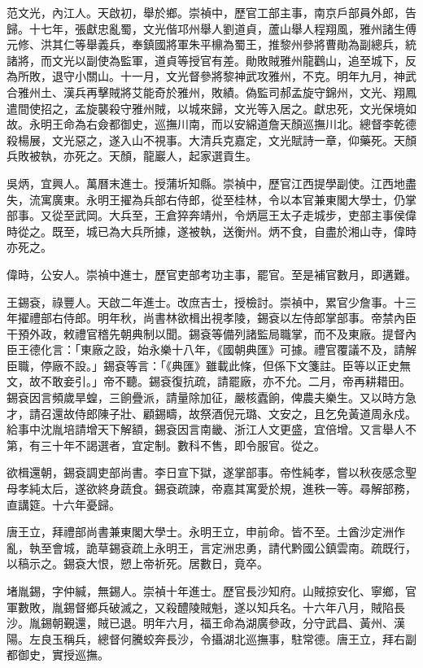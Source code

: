 \begin{pinyinscope}
范文光，內江人。天啟初，舉於鄉。崇禎中，歷官工部主事，南京戶部員外郎，告歸。十七年，張獻忠亂蜀，文光偕邛州舉人劉道貞，蘆山舉人程翔風，雅州諸生傅元修、洪其仁等舉義兵，奉鎮國將軍朱平檙為蜀王，推黎州參將曹勛為副總兵，統諸將，而文光以副使為監軍，道貞等授官有差。勛敗賊雅州龍鸛山，追至城下，反為所敗，退守小關山。十一月，文光督參將黎神武攻雅州，不克。明年九月，神武合雅州土、漢兵再擊賊將艾能奇於雅州，敗績。偽監司郝孟旋守錦州，文光、翔鳳遣間使招之，孟旋襲殺守雅州賊，以城來歸，文光等入居之。獻忠死，文光保境如故。永明王命為右僉都御史，巡撫川南，而以安綿道詹天顏巡撫川北。總督李乾德殺楊展，文光惡之，遂入山不視事。大清兵克嘉定，文光賦詩一章，仰藥死。天顏兵敗被執，亦死之。天顏，龍巖人，起家選貢生。

吳炳，宜興人。萬曆末進士。授蒲圻知縣。崇禎中，歷官江西提學副使。江西地盡失，流寓廣東。永明王擢為兵部右侍郎，從至桂林，令以本官兼東閣大學士，仍掌部事。又從至武岡。大兵至，王倉猝奔靖州，令炳扈王太子走城步，吏部主事侯偉時從之。既至，城已為大兵所據，遂被執，送衡州。炳不食，自盡於湘山寺，偉時亦死之。

偉時，公安人。崇禎中進士，歷官吏部考功主事，罷官。至是補官數月，即遘難。

王錫袞，祿豐人。天啟二年進士。改庶吉士，授檢討。崇禎中，累官少詹事。十三年擢禮部右侍郎。明年秋，尚書林欲楫出視孝陵，錫袞以左侍郎掌部事。帝禁內臣干預外政，敕禮官稽先朝典制以聞。錫袞等備列諸監局職掌，而不及東廠。提督內臣王德化言：「東廠之設，始永樂十八年，《國朝典匯》可據。禮官覆議不及，請解臣職，停廠不設。」錫袞等言：「《典匯》雖載此條，但係下文箋註。臣等以正史無文，故不敢妾引。」帝不聽。錫袞復抗疏，請罷廠，亦不允。二月，帝再耕耤田。錫袞因言頻歲旱蝗，三餉疊派，請量除加征，嚴核蠹餉，俾農夫樂生。又以時方急才，請召還故侍郎陳子壯、顧錫疇，故祭酒倪元璐、文安之，且乞免黃道周永戍。給事中沈胤培請增天下解額，錫袞因言南畿、浙江人文更盛，宜倍增。又言舉人不第，有三十年不謁選者，宜定制。數科不售，即令服官。從之。

欲楫還朝，錫袞調吏部尚書。李日宣下獄，遂掌部事。帝性純孝，嘗以秋夜感念聖母孝純太后，遂欲終身蔬食。錫袞疏諫，帝嘉其寓愛於規，進秩一等。尋解部務，直講筵。十六年憂歸。

唐王立，拜禮部尚書兼東閣大學士。永明王立，申前命。皆不至。土酋沙定洲作亂，執至會城，詭草錫袞疏上永明王，言定洲忠勇，請代黔國公鎮雲南。疏既行，以稿示之。錫袞大恨，愬上帝祈死。居數日，竟卒。

堵胤錫，字仲緘，無錫人。崇禎十年進士。歷官長沙知府。山賊掠安化、寧鄉，官軍數敗，胤錫督鄉兵破滅之，又殺醴陵賊魁，遂以知兵名。十六年八月，賊陷長沙。胤錫朝覲還，賊已退。明年六月，福王命為湖廣參政，分守武昌、黃州、漢陽。左良玉稱兵，總督何騰蛟奔長沙，令攝湖北巡撫事，駐常德。唐王立，拜右副都御史，實授巡撫。


\end{pinyinscope}
